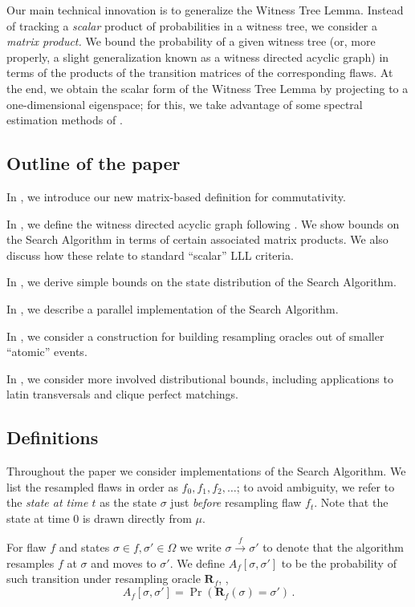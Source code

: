 \documentclass{toc}
\begin{document}
Our main technical innovation is to generalize the Witness Tree Lemma. Instead of
tracking a \emph{scalar} product of probabilities in a witness tree, we
%
consider a \emph{matrix product.}  We bound  the probability of a given witness tree (or, more properly, a slight generalization known as a witness directed acyclic graph) in terms of the products of the transition matrices of the corresponding flaws.  At the end, we obtain the scalar form of the Witness Tree Lemma by projecting to a one-dimensional eigenspace; for this, we take advantage of some spectral estimation methods of \cite{AIS}.

\subsection{Outline of the paper} 

%
In ,  %
we introduce our new matrix-based definition for commutativity.

%

In , we define the witness directed acyclic graph following \cite{ParallelHarrisHaeupler}.  We show bounds on the Search Algorithm in terms of certain associated matrix products. We also discuss how these relate to standard ``scalar'' LLL criteria.

In , we derive simple bounds on the state distribution  of the Search Algorithm.


In , we describe a parallel implementation of the Search Algorithm.

In , we consider a construction for building resampling oracles out of smaller ``atomic'' events. 

In , we consider more involved distributional bounds, including applications to latin transversals and clique perfect matchings.

\subsection{Definitions}
Throughout the paper we consider implementations of the Search Algorithm. We list the resampled flaws in order as $f_0, f_1, f_2, \dots$; to avoid ambiguity, we refer to the \emph{state at time $t$} as the state $\sigma$ just \emph{before} resampling flaw $f_t$. Note that the state at time 0 is drawn directly from $\mu$.

For flaw $f$ and states $\sigma \in f, \sigma' \in \Omega$ we write $\sigma \xrightarrow{f} \sigma'$ to denote that the algorithm  resamples $f$ at $\sigma$ and moves to $\sigma'$.  We define $A_f[\sigma, \sigma']$ to be the probability of such transition under resampling oracle $\mathbf R_f$, \ie,
$$
A_f[\sigma, \sigma'] = \Pr( \mathbf R_f( \sigma) = \sigma') \,.
$$
\end{document}
